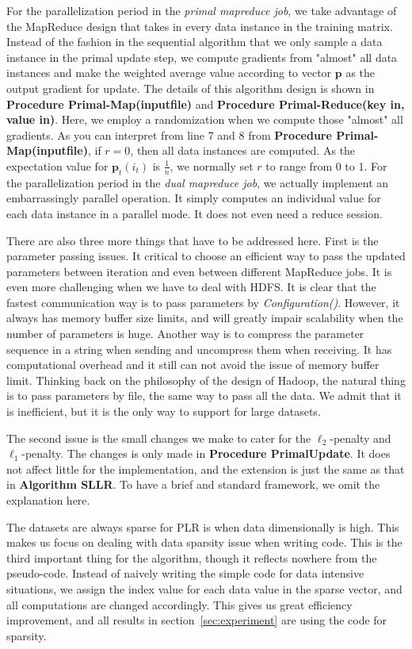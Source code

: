 \documentclass{llncs}
\newcommand{\bp}{\mathbf{p}}
\begin{document}
For the parallelization period in the \textit{primal mapreduce job}, we take advantage of the MapReduce design that takes in every data instance in the training matrix.
Instead of the fashion in the sequential algorithm that we only sample a data instance in the primal update step, we compute gradients from "almost" all data instances and make the weighted average value according to vector $\bp$ as the output gradient for update.
The details of this algorithm design is shown in \textbf{Procedure Primal-Map(inputfile)} and \textbf{Procedure Primal-Reduce(key in, value in)}.
Here, we employ a randomization when we compute those "almost" all gradients.
As you can interpret from line 7 and 8 from \textbf{Procedure Primal-Map(inputfile)}, if $r=0$, then all data instances are computed.
As the expectation value for $\bp_t(i_t)$ is $\frac{1}{n}$, we normally set $r$ to range from 0 to 1.
For the parallelization period in the \textit{dual mapreduce job}, we actually implement an embarrassingly parallel operation.
It simply computes an individual value for each data instance in a parallel mode. It does not even need a reduce session.

There are also three more things that have to be addressed here.
First is the parameter passing issues. It critical to choose an efficient way to pass the updated parameters between iteration and even between different MapReduce jobs.
It is even more challenging when we have to deal with HDFS. It is clear that the fastest communication way is to pass parameters by \textit{Configuration()}.
However, it always has memory buffer size limits, and will greatly impair scalability when the number of parameters is huge.
Another way is to compress the parameter sequence in a string when sending and uncompress them when receiving. It has computational overhead and it still can not avoid the issue of memory buffer limit. 
Thinking back on the philosophy of the design of Hadoop, the natural thing is to pass parameters by file, the same way to pass all the data.
We admit that it is inefficient, but it is the only way to support for large datasets.

The second issue is the small changes we make to cater for the $\ell_2$-penalty and $\ell_1$-penalty. The changes is only made in \textbf{Procedure PrimalUpdate}.
It does not affect little for the implementation, and the extension is just the same as that in \textbf{Algorithm SLLR}.
To have a brief and standard framework, we omit the explanation here.

The datasets are always sparse for PLR is when data dimensionally is high. This makes us focus on dealing with data sparsity issue when writing code.
This is the third important thing for the algorithm, though it reflects nowhere from the pseudo-code.
Instead of naively writing the simple code for data intensive situations, we assign the index value for each data value in the sparse vector, and all computations are changed accordingly.
This gives us great efficiency improvement, and all results in section~\ref{sec:experiment} are using the code for sparsity.
\end{document}

